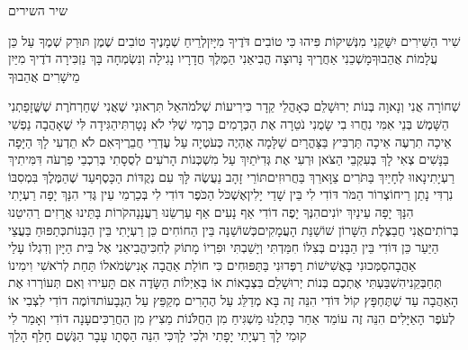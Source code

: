 \documentclass[../main/main.tex]{subfiles}
\begin{document}
\thispagestyle{empty}
\Incipit{}שיר השירים
\cleardoublepage
\RTLmulticolcolumns
\begin{multicols*}{\ncols}
שִׁיר הַשִּׁירִים \PreVerseSpace{}יִשָּׁקֵנִי מִנְּשִׁיקוֹת פִּיהוּ כִּי טוֹבִים דֹּדֶיךָ מִיָּיִן\PreVerseSpace{}לְרֵיחַ שְׁמָנֶיךָ טוֹבִים שֶׁמֶן תּוּרַק שְׁמֶךָ עַל כֵּן עֲלָמוֹת אֲהֵבוּךָ\PreVerseSpace{}מָשְׁכֵנִי אַחֲרֶיךָ נָּרוּצָה הֱבִיאַנִי הַמֶּלֶךְ חֲדָרָיו נָגִילָה וְנִשְׂמְחָה בָּךְ נַזְכִּירָה דֹדֶיךָ מִיַּיִן מֵישָׁרִים אֲהֵבוּךָ\OpenSection{}\par
{}שְׁחוֹרָה אֲנִי וְנָאוָה בְּנוֹת יְרוּשָׁלֵם כְּאָהֳלֵי קֵדָר כִּירִיעוֹת שְׁלֹמֹה\PreVerseSpace{}אַל תִּרְאוּנִי שֶׁאֲנִי שְׁחַרְחֹרֶת שֶׁשֱּׁזָפַתְנִי הַשָּׁמֶשׁ בְּנֵי אִמִּי נִחֲרוּ בִי שָׂמֻנִי נֹטֵרָה אֶת הַכְּרָמִים כַּרְמִי שֶׁלִּי לֹא נָטָרְתִּי\PreVerseSpace{}הַגִּידָה לִּי שֶׁאָהֲבָה נַפְשִׁי אֵיכָה תִרְעֶה אֵיכָה תַּרְבִּיץ בַּצָּהֳרָיִם שַׁלָּמָה אֶהְיֶה כְּעֹטְיָה עַל עֶדְרֵי חֲבֵרֶיךָ\PreVerseSpace{}אִם לֹא תֵדְעִי לָךְ הַיָּפָה בַּנָּשִׁים צְאִי לָךְ בְּעִקְבֵי הַצֹּאן וּרְעִי אֶת גְּדִיֹּתַיִךְ עַל מִשְׁכְּנוֹת הָרֹעִים \ClosedSection{}לְסֻסָתִי בְּרִכְבֵי פַרְעֹה דִּמִּיתִיךְ רַעְיָתִי\PreVerseSpace{}נָאווּ לְחָיַיִךְ בַּתֹּרִים צַוָּארֵךְ בַּחֲרוּזִים\PreVerseSpace{}תּוֹרֵי זָהָב נַעֲשֶׂה לָּךְ עִם נְקֻדּוֹת הַכָּסֶף\PreVerseSpace{}עַד שֶׁהַמֶּלֶךְ בִּמְסִבּוֹ נִרְדִּי נָתַן רֵיחוֹ\PreVerseSpace{}צְרוֹר הַמֹּר דּוֹדִי לִי בֵּין שָׁדַי יָלִין\PreVerseSpace{}אֶשְׁכֹּל הַכֹּפֶר דּוֹדִי לִי בְּכַרְמֵי עֵין גֶּדִי \ClosedSection{}הִנָּךְ יָפָה רַעְיָתִי הִנָּךְ יָפָה עֵינַיִךְ יוֹנִים\PreVerseSpace{}הִנְּךָ יָפֶה דוֹדִי אַף נָעִים אַף עַרְשֵׂנוּ רַעֲנָנָה\PreVerseSpace{}קֹרוֹת בָּתֵּינוּ אֲרָזִים רַהִיטֵנוּ\SubEnd{} בְּרוֹתִים\PreChapterSpace{}אֲנִי חֲבַצֶּלֶת הַשָּׁרוֹן שׁוֹשַׁנַּת הָעֲמָקִים\PreVerseSpace{}כְּשׁוֹשַׁנָּה בֵּין הַחוֹחִים כֵּן רַעְיָתִי בֵּין הַבָּנוֹת\PreVerseSpace{}כְּתַפּוּחַ בַּעֲצֵי הַיַּעַר כֵּן דּוֹדִי בֵּין הַבָּנִים בְּצִלּוֹ חִמַּדְתִּי וְיָשַׁבְתִּי וּפִרְיוֹ מָתוֹק לְחִכִּי\PreVerseSpace{}הֱבִיאַנִי אֶל בֵּית הַיָּיִן וְדִגְלוֹ עָלַי אַהֲבָה\PreVerseSpace{}סַמְּכוּנִי בָּאֲשִׁישׁוֹת רַפְּדוּנִי בַּתַּפּוּחִים כִּי חוֹלַת אַהֲבָה אָנִי\PreVerseSpace{}שְׂמֹאלוֹ תַּחַת לְרֹאשִׁי וִימִינוֹ תְּחַבְּקֵנִי\PreVerseSpace{}הִשְׁבַּעְתִּי אֶתְכֶם בְּנוֹת יְרוּשָׁלֵם בִּצְבָאוֹת אוֹ בְּאַיְלוֹת הַשָּׂדֶה אִם תָּעִירוּ וְאִם תְּעוֹרְרוּ אֶת הָאַהֲבָה עַד שֶׁתֶּחְפָּץ \ClosedSection{}קוֹל דּוֹדִי הִנֵּה זֶה בָּא מְדַלֵּג עַל הֶהָרִים מְקַפֵּץ עַל הַגְּבָעוֹת\PreVerseSpace{}דּוֹמֶה דוֹדִי לִצְבִי אוֹ לְעֹפֶר הָאַיָּלִים הִנֵּה זֶה עוֹמֵד אַחַר כָּתְלֵנוּ מַשְׁגִּיחַ מִן הַחֲלֹּנוֹת מֵצִיץ מִן הַחֲרַכִּים\PreVerseSpace{}עָנָה דוֹדִי וְאָמַר לִי קוּמִי לָךְ רַעְיָתִי יָפָתִי וּלְכִי לָךְ\PreVerseSpace{}כִּי הִנֵּה הַסְּתָו עָבָר הַגֶּשֶׁם חָלַף הָלַךְ 
\end{multicols*}
\end{document}

